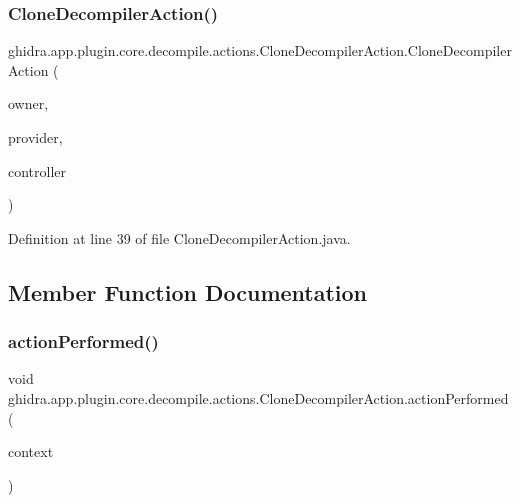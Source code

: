 \subsubsection{\texorpdfstring{CloneDecompilerAction()}{CloneDecompilerAction()}}
{\footnotesize\ttfamily ghidra.\+app.\+plugin.\+core.\+decompile.\+actions.\+Clone\+Decompiler\+Action.\+Clone\+Decompiler\+Action (\begin{DoxyParamCaption}\item[{String}]{owner,  }\item[{\mbox{\hyperlink{classghidra_1_1app_1_1plugin_1_1core_1_1decompile_1_1_decompiler_provider}{Decompiler\+Provider}}}]{provider,  }\item[{\mbox{\hyperlink{classghidra_1_1app_1_1decompiler_1_1component_1_1_decompiler_controller}{Decompiler\+Controller}}}]{controller }\end{DoxyParamCaption})\hspace{0.3cm}{\ttfamily [inline]}}



Definition at line 39 of file Clone\+Decompiler\+Action.\+java.



\subsection{Member Function Documentation}
\mbox{\label{classghidra_1_1app_1_1plugin_1_1core_1_1decompile_1_1actions_1_1_clone_decompiler_action_ac35526e35fa9299322a15ad33eeba884}} 
\subsubsection{\texorpdfstring{actionPerformed()}{actionPerformed()}}
{\footnotesize\ttfamily void ghidra.\+app.\+plugin.\+core.\+decompile.\+actions.\+Clone\+Decompiler\+Action.\+action\+Performed (\begin{DoxyParamCaption}\item[{Action\+Context}]{context }\end{DoxyParamCaption})\hspace{0.3cm}{\ttfamily [inline]}}



